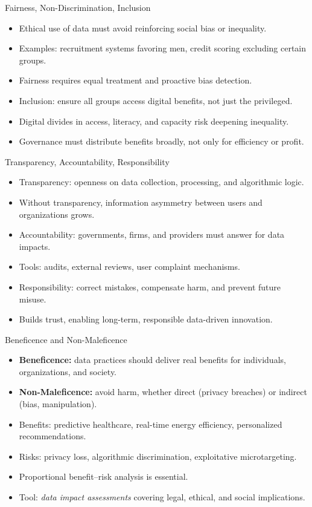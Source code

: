 \documentclass[aspectratio=169, table]{beamer}
\begin{document}
\begin{frame}{Fairness, Non-Discrimination, Inclusion}
	\vspace{20pt}
	\begin{itemize}
		\item Ethical use of data must avoid reinforcing social bias or inequality.  
		\item Examples: recruitment systems favoring men, credit scoring excluding certain groups.  
		\item Fairness requires equal treatment and proactive bias detection.  
		\item Inclusion: ensure all groups access digital benefits, not just the privileged.  
		\item Digital divides in access, literacy, and capacity risk deepening inequality.  
		\item Governance must distribute benefits broadly, not only for efficiency or profit.  
	\end{itemize}
\end{frame}

\begin{frame}{Transparency, Accountability, Responsibility}
	\vspace{20pt}
	\begin{itemize}
		\item Transparency: openness on data collection, processing, and algorithmic logic.  
		\item Without transparency, information asymmetry between users and organizations grows.  
		\item Accountability: governments, firms, and providers must answer for data impacts.  
		\item Tools: audits, external reviews, user complaint mechanisms.  
		\item Responsibility: correct mistakes, compensate harm, and prevent future misuse.  
		\item Builds trust, enabling long-term, responsible data-driven innovation.  
	\end{itemize}
\end{frame}

\begin{frame}{Beneficence and Non-Maleficence}
	\vspace{20pt}
	\begin{itemize}
		\item \textbf{Beneficence:} data practices should deliver real benefits for individuals, organizations, and society.  
		\item \textbf{Non-Maleficence:} avoid harm, whether direct (privacy breaches) or indirect (bias, manipulation).  
		\item Benefits: predictive healthcare, real-time energy efficiency, personalized recommendations.  
		\item Risks: privacy loss, algorithmic discrimination, exploitative microtargeting.  
		\item Proportional benefit–risk analysis is essential.  
		\item Tool: \textit{data impact assessments} covering legal, ethical, and social implications.  
	\end{itemize}
\end{frame}
\end{document}
